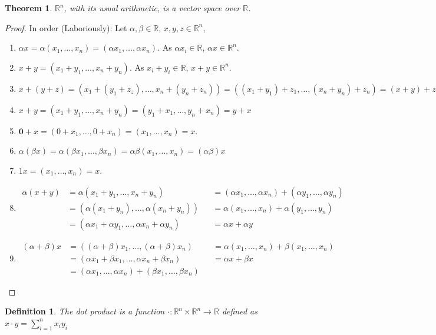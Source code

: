 \documentclass[12pt,oneside]{book}
\theoremstyle{mystyle}
\newtheorem{theorem}{Theorem}[section]
\newtheorem{definition}{Definition}[section]
\begin{document}
\begin{theorem}
$\mathbb{R}^n$, with its usual arithmetic, is a vector space over $\mathbb{R}$.
\end{theorem}
\begin{proof}
In order (Laboriously): Let $\alpha, \beta \in \mathbb{R}$, $x,y,z\in \mathbb{R}^n$,
\begin{enumerate}
\item $\alpha x = \alpha(x_1,\hdots,x_n) = (\alpha x_1,\hdots, \alpha x_n)$. As $\alpha x_i \in \mathbb{R}$, $\alpha x \in \mathbb{R}^n$.
\item $x+y = (x_1+y_1,\hdots,x_n+y_n)$. As $x_i+y_i \in \mathbb{R}$, $x+y\in \mathbb{R}^n$.
\item $x+(y+z) = (x_1+(y_1+z_z),\hdots, x_n+(y_n+z_n)) = ((x_1+y_1)+z_1,\hdots, (x_n+y_n)+z_n) = (x+y)+z$
\item $x+y = (x_1+y_1,\hdots,x_n+y_n) = (y_1+x_1,\hdots, y_n+x_n)=y+x$
\item $\mathbf{0}+x = (0+x_1,\hdots, 0+x_n) = (x_1,\hdots, x_n) = x$.
\item $\alpha(\beta x) = \alpha(\beta x_1,\hdots, \beta x_n) = \alpha \beta (x_1,\hdots, x_n) = (\alpha \beta) x$
\item $1 x = (x_1,\hdots, x_n) = x$.
\item
    \begin{align*}
        \alpha(x+y) &= \alpha(x_1+y_1,\hdots, x_n+y_n) & &= (\alpha x_1, \hdots, \alpha x_n) + (\alpha y_1,\hdots, \alpha y_n)\\
        &= (\alpha(x_1+y_n),\hdots, \alpha(x_n+y_n)) & &= \alpha(x_1,\hdots, x_n)+\alpha(y_1,\hdots, y_n)\\
        &= (\alpha x_1+\alpha y_1,\hdots, \alpha x_n + \alpha y_n) & &= \alpha x + \alpha y
    \end{align*} 
\item
    \begin{align*}
        (\alpha + \beta)x &= ((\alpha+\beta)x_1,\hdots, (\alpha+\beta)x_n) & &= \alpha (x_1, \hdots, x_n)+\beta (x_1, \hdots, x_n)\\
        &= (\alpha x_1 + \beta x_1,\hdots, \alpha x_n + \beta x_n) & &= \alpha x+\beta x\\
        &= (\alpha x_1,\hdots, \alpha x_n) + (\beta x_1,\hdots, \beta x_n)
    \end{align*}
\end{enumerate}
\end{proof}

\begin{definition}
The dot product is a function $\cdot:\mathbb{R}^n \times \mathbb{R}^n \rightarrow \mathbb{R}$ defined as $x\cdot y = \sum_{i=1}^{n} x_iy_i$
\end{definition}
\end{document}
